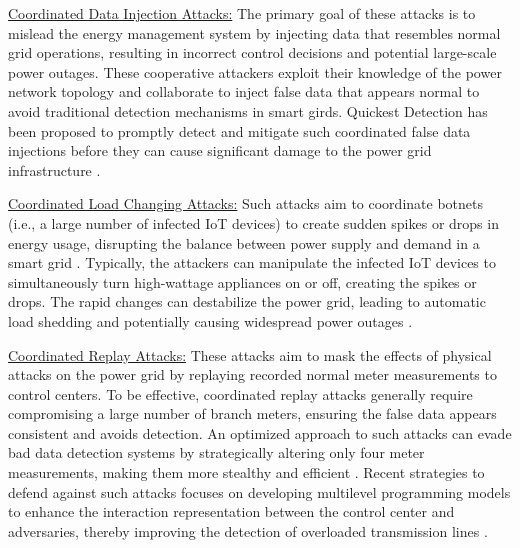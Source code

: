 \documentclass[10pt, journal]{IEEEtran}
\begin{document}

\underline{Coordinated Data Injection Attacks:} The primary goal of these attacks is to mislead the energy management system by injecting data that resembles normal grid operations, resulting in incorrect control decisions and potential large-scale power outages. These cooperative attackers exploit their knowledge of the power network topology and collaborate to inject false data that appears normal to avoid traditional detection mechanisms in smart girds. Quickest Detection has been proposed to promptly detect and mitigate such coordinated false data injections before they can cause significant damage to the power grid infrastructure \cite{cui2012coordinated}.

\underline{Coordinated Load Changing Attacks:} Such attacks aim to coordinate botnets (i.e., a large number of infected IoT devices) to create sudden spikes or drops in energy usage, disrupting the balance between power supply and demand in a smart grid \cite{arnaboldi2020modelling}. Typically, the attackers can manipulate the infected IoT devices to simultaneously turn high-wattage appliances on or off, creating the spikes or drops. The rapid changes can destabilize the power grid, leading to automatic load shedding and potentially causing widespread power outages \cite{dabrowski2017grid}.


\underline{Coordinated Replay Attacks:} These attacks aim to mask the effects of physical attacks on the power grid by replaying recorded normal meter measurements to control centers. To be effective, coordinated replay attacks generally require compromising a large number of branch meters, ensuring the false data appears consistent and avoids detection. An optimized approach to such attacks can evade bad data detection systems by strategically altering only four meter measurements, making them more stealthy and efficient \cite{deng2017ccpa}. Recent  strategies to defend against such attacks focuses on developing multilevel programming models to enhance the interaction representation between the control center and adversaries, thereby improving the detection of overloaded transmission lines \cite{tian2019multilevel}.
\end{document}
